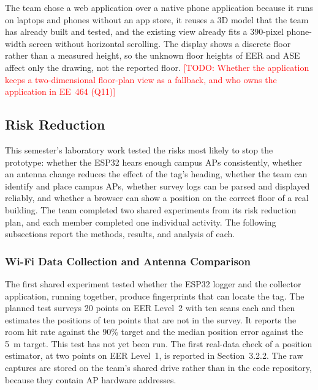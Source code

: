 \documentclass[12pt,letterpaper]{article}
\newcommand{\TODO}[1]{\textcolor{red}{[TODO: #1]}}
\begin{document}
The team chose a web application over a native phone application because it runs on laptops and
phones without an app store, it reuses a 3D model that the team has already built and tested, and the
existing view already fits a 390-pixel phone-width screen without horizontal scrolling. The display shows a discrete floor rather than a measured height, so the unknown floor
heights of EER and ASE affect only the drawing, not the reported floor. \TODO{Whether the
application keeps a two-dimensional floor-plan view as a fallback, and who owns the application in
EE~464 (Q11)}

\subsection{Risk Reduction}\label{sec:risk}
This semester's laboratory work tested the risks most likely to stop the prototype: whether the
ESP32 hears enough campus APs consistently, whether an antenna change reduces the effect of the tag's
heading, whether the team can identify and place campus APs, whether survey logs can be parsed and
displayed reliably, and whether a browser can show a position on the correct floor of a real
building. The team completed two shared experiments from its risk reduction plan, and each member
completed one individual activity. The following subsections report the methods, results, and
analysis of each.

\subsubsection{Wi-Fi Data Collection and Antenna Comparison}
The first shared experiment tested whether the ESP32 logger and the collector application, running
together, produce fingerprints that can locate the tag. The planned test surveys 20 points on EER
Level~2 with ten scans each and then estimates the positions of ten points that are not in the
survey. It reports the room hit rate against the 90\% target and the median position error against
the 5~m target. This test has not yet been run. The first real-data check of a position estimator,
at two points on EER Level~1, is reported in Section~3.2.2. The raw captures are stored on the team's
shared drive rather than in the code repository, because they contain AP hardware addresses.
\end{document}
